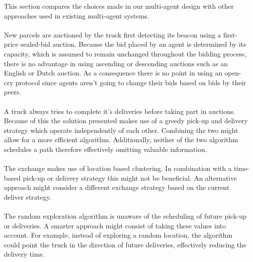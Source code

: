 \documentclass[../main.tex]{subfiles}
\begin{document}
This section compares the choices made in our multi-agent design with other approaches used in existing multi-agent systems.
\\\\
New parcels are auctioned by the truck first detecting its beacon using a first-price sealed-bid auction. Because the bid placed by an agent is determined by its capacity, which is assumed to remain unchanged throughout the bidding process, there is no advantage in using ascending or descending auctions such as an English or Dutch auction. As a consequence there is no point in using an open-cry protocol since agents aren't going to change their bids based on bids by their peers.
\\\\
A truck always tries to complete it's deliveries before taking part in auctions. Because of this the solution presented makes use of a greedy pick-up and delivery strategy which operate independently of each other. Combining the two might allow for a more efficient algorithm. Additionally, neither of the two algorithm schedules a path therefore effectively omitting valuable information.
\\\\
The exchange makes use of location based clustering. In combination with a time-based pick-up or delivery strategy this might not be beneficial. An alternative approach might consider a different exchange strategy based on the current deliver strategy.
\\\\
The random exploration algorithm is unaware of the scheduling of future pick-up or deliveries. A smarter approach might consist of taking these values into account. For example, instead of exploring a random location, the algorithm could point the truck in the direction of future deliveries, effectively reducing the delivery time.
\end{document}
